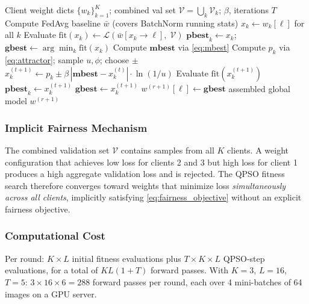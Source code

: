 \documentclass[conference]{IEEEtran}
\begin{document}
\begin{algorithm}
\caption{FedQPSO server-side aggregation (round $r$)}
\label{alg:fedqpso}
\begin{algorithmic}[1]
\REQUIRE Client weight dicts $\{w_k\}_{k=1}^K$; combined val set
$\mathcal{V} = \bigcup_k \mathcal{V}_k$; $\beta$, iterations $T$
\STATE Compute FedAvg baseline $\bar{w}$ (covers BatchNorm running stats)
    \STATE $x_k \leftarrow w_k[\ell]$ for all $k$ \hfill {}
    \STATE Evaluate $\mathrm{fit}(x_k) \leftarrow \mathcal{L}(\bar{w}[x_k \to \ell],\;\mathcal{V})$
    \STATE $\mathbf{pbest}_k \leftarrow x_k$;\quad $\mathbf{gbest} \leftarrow \arg\min_k \mathrm{fit}(x_k)$
        \STATE Compute $\mathbf{mbest}$ via \eqref{eq:mbest}
            \STATE Compute $p_k$ via \eqref{eq:attractor}; sample $u,\phi$; choose $\pm$
            \STATE $x_k^{(t+1)} \leftarrow p_k \pm \beta\,|\mathbf{mbest}-x_k^{(t)}|\cdot\ln(1/u)$
            \STATE Evaluate $\mathrm{fit}(x_k^{(t+1)})$
                \STATE $\mathbf{pbest}_k \leftarrow x_k^{(t+1)}$
            \ENDIF
                \STATE $\mathbf{gbest} \leftarrow x_k^{(t+1)}$
            \ENDIF
        \ENDFOR
    \ENDFOR
    \STATE $w^{(r+1)}[\ell] \leftarrow \mathbf{gbest}$
    \hfill {}
\ENDFOR
\RETURN assembled global model $w^{(r+1)}$
\end{algorithmic}
\end{algorithm}

\subsubsection{Implicit Fairness Mechanism}
The combined validation set $\mathcal{V}$ contains samples from all $K$
clients. A weight configuration that achieves low loss for clients 2 and 3
but high loss for client 1 produces a high aggregate validation loss and is
rejected. The QPSO fitness search therefore converges toward weights that
minimize loss \emph{simultaneously across all clients}, implicitly
satisfying \eqref{eq:fairness_objective} without an explicit fairness
objective.

\subsubsection{Computational Cost}
Per round: $K \times L$ initial fitness evaluations plus $T \times K \times L$
QPSO-step evaluations, for a total of $K L(1 + T)$ forward passes. With
$K\!=\!3$, $L\!=\!16$, $T\!=\!5$: $3 \times 16 \times 6 = 288$ forward
passes per round, each over 4 mini-batches of 64 images on a GPU server.
\end{document}

